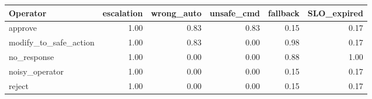 \begin{tabular}{lrrrrr}
\toprule
Operator & escalation & wrong\_auto & unsafe\_cmd & fallback & SLO\_expired \\
\midrule
approve & 1.00 & 0.83 & 0.83 & 0.15 & 0.17 \\
modify\_to\_safe\_action & 1.00 & 0.83 & 0.00 & 0.98 & 0.17 \\
no\_response & 1.00 & 0.00 & 0.00 & 0.88 & 1.00 \\
noisy\_operator & 1.00 & 0.00 & 0.00 & 0.15 & 0.17 \\
reject & 1.00 & 0.00 & 0.00 & 0.15 & 0.17 \\
\bottomrule
\end{tabular}
